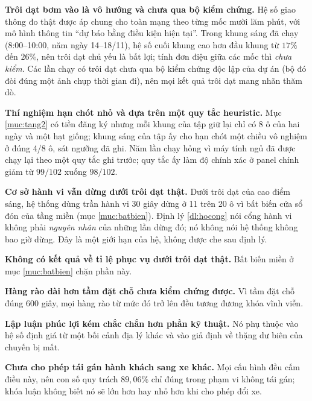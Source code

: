 \textbf{Trôi dạt bơm vào là vô hướng và chưa qua bộ kiểm chứng.} Hệ số giao thông đo thật được
áp chung cho toàn mạng theo từng mốc mười lăm phút, với mô hình thông tin ``dự báo bằng điều kiện
hiện tại''. Trong khung sáng đã chạy (8:00--10:00, năm ngày 14--18/11), hệ số cuối khung cao hơn
đầu khung từ $17\%$ đến $26\%$, nên trôi dạt chủ yếu là bất lợi; tính đơn điệu giữa các mốc thì
\emph{chưa kiểm}. Các lần chạy có trôi dạt chưa qua bộ kiểm chứng
độc lập của dự án (bộ đó đòi đúng một ảnh chụp thời gian đi), nên mọi kết quả trôi dạt mang nhãn
thăm dò.

\textbf{Thí nghiệm hạn chót nhỏ và dựa trên một quy tắc heuristic.} Mục \ref{muc:tang2} có tiền đăng
ký nhưng mỗi khung của tập giữ lại chỉ có 8 ô của hai ngày và một hạt giống; khung sáng của tập ấy
cho hạn chót một chiều vô nghiệm ở đúng 4/8 ô, sát ngưỡng đã ghi. Năm lần chạy hỏng vì máy tính ngủ
đã được chạy lại theo một quy tắc ghi trước; quy tắc ấy làm độ chính xác ở panel chính giảm từ
$99/102$ xuống $98/102$.

\textbf{Cơ sở hành vi vẫn dừng dưới trôi dạt thật.} Dưới trôi dạt của cao điểm sáng, hệ thống
dùng trần hành vi 30 giây dừng ở 11 trên 20 ô vì bất biến cửa sổ đón của tầng miền (mục
\ref{muc:batbien}). Định lý \ref{dl:hocong} nói cổng hành vi không phải \emph{nguyên nhân} của
những lần dừng đó; nó không nói hệ thống không bao giờ dừng. Đây là một giới hạn của hệ, không
được che sau định lý.

\textbf{Không có kết quả về tỉ lệ phục vụ dưới trôi dạt thật.} Bất biến miền ở mục \ref{muc:batbien} chặn phần
này.

\textbf{Hàng rào dài hơn tầm đặt chỗ chưa kiểm chứng được.} Vì tầm đặt chỗ đúng 600 giây, mọi
hàng rào từ mức đó trở lên đều tương đương khóa vĩnh viễn.

\textbf{Lập luận phúc lợi kém chắc chắn hơn phần kỹ thuật.} Nó phụ thuộc vào hệ số định giá từ
một bối cảnh địa lý khác và vào giả định về thặng dư biên của chuyến bị mất.

\textbf{Chưa cho phép tái gán hành khách sang xe khác.} Mọi cấu hình đều cấm điều này, nên con
số quy trách $89{,}06\%$ chỉ đúng trong phạm vi không tái gán; khóa luận không biết nó sẽ lớn hơn
hay nhỏ hơn khi cho phép đổi xe.
